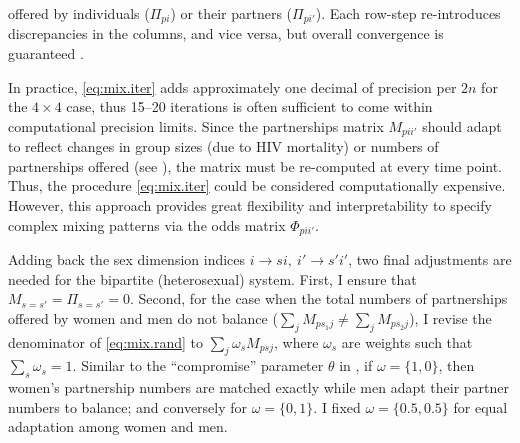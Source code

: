 offered by individuals ($\Pi_{pi}$) or their partners ($\Pi_{pi'}$).
Each row-step re-introduces discrepancies in the columns, and vice versa,
but overall convergence is guaranteed \cite{Sinkhorn1964}.
\par
In practice, \eqref{eq:mix.iter} adds approximately
one decimal of precision per $2n$ for the $4\times4$ case,
thus 15--20 iterations is often sufficient to come within computational precision limits.
Since the partnerships matrix $M_{pii'}$ should adapt to reflect changes in
group sizes (\eg due to HIV mortality) or
numbers of partnerships offered (\eg see ),
the matrix must be re-computed at every time point.
Thus, the procedure \eqref{eq:mix.iter} could be considered computationally expensive.
However, this approach provides great flexibility and interpretability
to specify complex mixing patterns via the odds matrix $\Phi_{pii'}$.
\par
Adding back the sex dimension indices $i \rightarrow si, ~ i' \rightarrow s'i'$,
two final adjustments are needed for the bipartite (\ie heterosexual) system.
First, I ensure that $M_{s=s'} = \Pi_{s=s'} = 0$.
Second, for the case when the total numbers of partnerships offered by women and men
do not balance ($\sum_j M_{ps_{1}j} \ne \sum_j M_{ps_{2}j}$),
I revise the denominator of \eqref{eq:mix.rand} to $\sum_{j} \omega_s M_{psj}$,
where $\omega_s$ are weights such that $\sum_s \omega_s = 1$.
Similar to the ``compromise'' parameter $\theta$ in \cite{Garnett1994},
if $\omega = \{1,0\}$, then women's partnership numbers are matched exactly
while men adapt their partner numbers to balance;
and conversely for $\omega = \{0,1\}$.
I fixed $\omega = \{0.5,0.5\}$ for equal adaptation among women and men.
